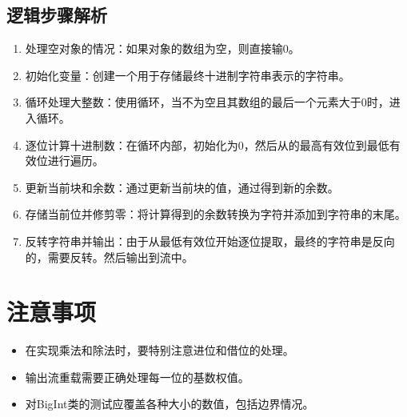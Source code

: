 \subsection{逻辑步骤解析}
\begin{enumerate}
    \item 处理空对象的情况：如果对象的数组为空，则直接输0。
    \item 初始化变量：创建一个用于存储最终十进制字符串表示的字符串。
    \item 循环处理大整数：使用循环，当不为空且其数组的最后一个元素大于0时，进入循环。
    \item 逐位计算十进制数：在循环内部，初始化为0，然后从的最高有效位到最低有效位进行遍历。
    \item 更新当前块和余数：通过更新当前块的值，通过得到新的余数。
    \item 存储当前位并修剪零：将计算得到的余数转换为字符并添加到字符串的末尾。
    \item 反转字符串并输出：由于从最低有效位开始逐位提取，最终的字符串是反向的，需要反转。然后输出到流中。
\end{enumerate}

\section{注意事项}
\begin{itemize}
    \item 在实现乘法和除法时，要特别注意进位和借位的处理。
    \item 输出流重载需要正确处理每一位的基数权值。
    \item 对BigInt类的测试应覆盖各种大小的数值，包括边界情况。
\end{itemize}
